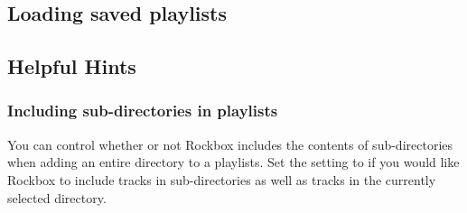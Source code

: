 \subsection{Loading saved playlists}

\subsection{Helpful Hints}

\subsubsection{Including sub-directories in playlists}
You can control whether or not Rockbox includes the contents of
sub-directories when adding an entire directory to a playlists.
Set the  setting to  if you would like
Rockbox to include tracks in sub-directories as well as tracks in the
currently selected directory.
